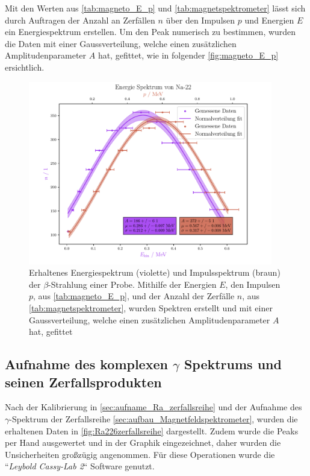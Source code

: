 \documentclass[12pt,english,ngerman]{scrartcl}
\begin{document}
Mit den Werten aus \autoref{tab:magneto_E_p} und
\autoref{tab:magnetspektrometer} lässt sich durch Auftragen der Anzahl an
Zerfällen $n$ über den Impulsen $p$ und Energien $E$ ein Energiespektrum
erstellen. Um den Peak numerisch zu bestimmen, wurden die Daten mit einer
Gaussverteilung, welche einen zusätzlichen Amplitudenparameter $A$ hat,
gefittet, wie in folgender \autoref{fig:magneto_E_p} ersichtlich.

\begin{figure}[H]
	\begin{center}
		\includegraphics[width = 0.95\textwidth]{figures/energiespektrum.pdf}
	\end{center}
	\caption[Energie- und Impulsspektogram der $\beta$-Strahlung einer 
		Probe]{
		Erhaltenes Energiespektrum (violette) und Impulsspektrum (braun) der
		$\beta$-Strahlung einer  Probe. Mithilfe der Energien $E$, den
		Impulsen $p$, aus \autoref{tab:magneto_E_p}, und der Anzahl der Zerfälle $n$,
		aus \autoref{tab:magnetspektrometer}, wurden Spektren erstellt und mit einer
		Gaussverteilung, welche einen zusätzlichen Amplitudenparameter $A$ hat,
		gefittet
	}\label{fig:magneto_E_p}
\end{figure}

\subsection{Aufnahme des komplexen \texorpdfstring{$\gamma$}{gamma} Spektrums
	und seinen Zerfallsprodukten}

Nach der Kalibrierung in \autoref{sec:aufname_Ra_zerfallsreihe} und der
Aufnahme des \(\gamma\)-Spektrum der  Zerfallsreihe
\autoref{sec:aufbau_Magnetfeldspektrometer}, wurden die erhaltenen Daten in
\autoref{fig:Ra226zerfallsreihe} dargestellt. Zudem wurde die Peaks per Hand
ausgewertet und in der Graphik eingezeichnet, daher wurden die Unsicherheiten
großzügig angenommen. Für diese Operationen wurde die ``\emph{Leybold Cassy-Lab
	2}`` Software genutzt.
\end{document}
